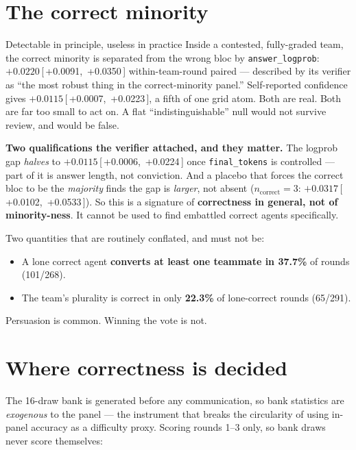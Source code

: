 \documentclass[11pt]{article}
\newcommand{\ci}[2]{\,[\,#1,\ #2\,]}
\begin{document}
\section{The correct minority}

\begin{takeaway}{Detectable in principle, useless in practice}
Inside a contested, fully-graded team, the correct minority is separated from the wrong bloc by
\texttt{answer\_logprob}: $+0.0220$\ci{+0.0091}{+0.0350} within-team-round paired --- described by
its verifier as ``the most robust thing in the correct-minority panel.'' Self-reported confidence
gives $+0.0115$\ci{+0.0007}{+0.0223}, a fifth of one grid atom. Both are real. Both are far too
small to act on. A flat ``indistinguishable'' null would not survive review, and would be false.

\smallskip
\textbf{Two qualifications the verifier attached, and they matter.} The logprob gap \emph{halves}
to $+0.0115$\ci{+0.0006}{+0.0224} once \texttt{final\_tokens} is controlled --- part of it is
answer length, not conviction. And a placebo that forces the correct bloc to be the \emph{majority}
finds the gap is \emph{larger}, not absent ($n_{\text{correct}}{=}3$:
$+0.0317$\ci{+0.0102}{+0.0533}). So this is a signature of \textbf{correctness in general, not of
minority-ness}. It cannot be used to find embattled correct agents specifically.
\end{takeaway}

Two quantities that are routinely conflated, and must not be:

\begin{itemize}
\item A lone correct agent \textbf{converts at least one teammate in 37.7\%} of rounds (101/268).
\item The team's plurality is correct in only \textbf{22.3\%} of lone-correct rounds (65/291).
\end{itemize}

Persuasion is common. Winning the vote is not.

\section{Where correctness is decided}

The 16-draw bank is generated before any communication, so bank statistics are \emph{exogenous} to
the panel --- the instrument that breaks the circularity of using in-panel accuracy as a difficulty
proxy. Scoring rounds 1--3 only, so bank draws never score themselves:
\end{document}
